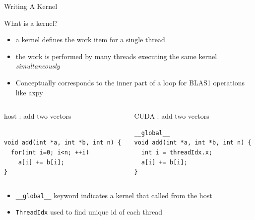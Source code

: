 \documentclass[aspectratio=43]{beamer}
\newcommand{\axpy}{{\ttfamily axpy}\xspace}
\newcommand{\lst}[1]{\colorbox{white!90!blue}{\lstinline!#1!}}
\begin{document}
\begin{frame}[fragile]{Writing A Kernel}
    \begin{info}{What is a kernel?}
    \begin{itemize}
        \item a kernel defines the work item for a single thread
        \item the work is performed by many threads executing the same kernel \emph{simultaneously}
        \item Conceptually corresponds to the inner part of a loop for BLAS1 operations like \axpy
    \end{itemize}
    \end{info}

    \vspace{-10pt}
    \begin{columns}[T]
        \begin{column}{0.5\textwidth}
            \begin{codecolumn}{host : add two vectors}
        \begin{lstlisting}[style=boxcudatiny]

void add(int *a, int *b, int n) {
  for(int i=0; i<n; ++i)
    a[i] += b[i];
}
        \end{lstlisting}
            \end{codecolumn}
        \end{column}
        \begin{column}{0.5\textwidth}
            \begin{codecolumn}{CUDA : add two vectors}
        \begin{lstlisting}[style=boxcudatiny]
__global__
void add(int *a, int *b, int n) {
  int i = threadIdx.x;
  a[i] += b[i];
}
        \end{lstlisting}
            \end{codecolumn}
        \end{column}
    \end{columns}

    \vspace{-2pt}
    \begin{info}{}
    \begin{itemize}
        \item \lst{__global__} keyword indicates a kernel that called from the host
        \item \lst{ThreadIdx} used to find unique id of each thread
    \end{itemize}
    \end{info}
\end{frame}
\end{document}
